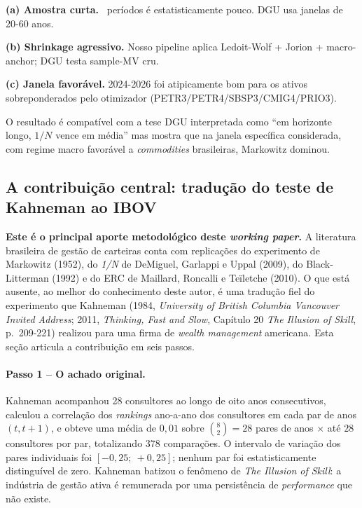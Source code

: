 \documentclass[12pt,a4paper,oneside]{article}
\begin{document}
\textbf{(a) Amostra curta.} \IngenuoPeriods\ períodos é estatisticamente
pouco. DGU usa janelas de 20-60 anos.

\textbf{(b) Shrinkage agressivo.} Nosso pipeline aplica Ledoit-Wolf
+ Jorion + macro-anchor; DGU testa sample-MV cru.

\textbf{(c) Janela favorável.} 2024-2026 foi atipicamente bom para os
ativos sobreponderados pelo otimizador (PETR3/PETR4/SBSP3/CMIG4/PRIO3).

O resultado é compatível com a tese DGU interpretada como ``em
horizonte longo, $1/N$ vence em média'' \textemdash{} mas mostra que
na janela específica considerada, com regime macro favorável a
\textit{commodities} brasileiras, Markowitz dominou.

\subsection{A contribuição central: tradução do teste de Kahneman ao IBOV}\label{sec:disc:kahneman}

\textbf{Este é o principal aporte metodológico deste \textit{working
paper}.} A literatura brasileira de gestão de carteiras conta com
replicações do experimento de Markowitz (1952), do \textit{1/N} de
DeMiguel, Garlappi e Uppal (2009), do Black-Litterman (1992) e do ERC
de Maillard, Roncalli e Teïletche (2010). O que está ausente, ao
melhor do conhecimento deste autor, é uma tradução fiel do
experimento que Kahneman (1984, \textit{University of British
Columbia Vancouver Invited Address}; 2011, \textit{Thinking, Fast and
Slow}, Capítulo 20 \textit{The Illusion of Skill}, p.~209-221)
realizou para uma firma de \textit{wealth management} americana.
Esta seção articula a contribuição em seis passos.

\paragraph{Passo 1 -- O achado original.}
Kahneman acompanhou 28 consultores ao longo de oito anos consecutivos,
calculou a correlação dos \textit{rankings} ano-a-ano dos consultores
em cada par de anos $(t, t+1)$, e obteve uma média de
\textbf{$0{,}01$} sobre $\binom{8}{2} = 28$ pares de anos $\times$
até $28$ consultores por par, totalizando $378$ comparações. O
intervalo de variação dos pares individuais foi $[-0{,}25;\ +0{,}25]$;
nenhum par foi estatisticamente distinguível de zero. Kahneman
batizou o fenômeno de \textit{The Illusion of Skill}: a indústria de
gestão ativa é remunerada por uma persistência de \textit{performance}
que não existe.
\end{document}
